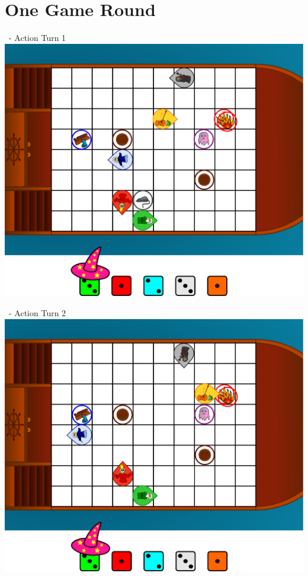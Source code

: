 \documentclass[presentation]{beamer}
\begin{document}
\section{One Game Round}

\begin{frame}{\insertsection\ - Action Turn 1}
	\center
	\includegraphics[width=\textheight]{ingame_sketch_1.pdf}
\end{frame}

\begin{frame}{\insertsection\ - Action Turn 2}
	\center
	\includegraphics[width=\textheight]{ingame_sketch_2.pdf}
\end{frame}
\end{document}
